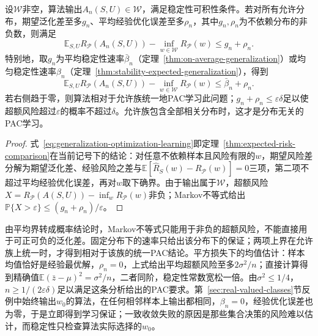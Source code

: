 \begin{theorem}[稳定性与经验最优性给出超额期望风险]
\label{thm:generalization-optimization-learning}
\label{thm:stability-excess-risk}
设$\mathcal W$非空，算法输出$A_n(S,U)\in\mathcal W$，满足稳定性可积性条件。若对所有允许分布，期望泛化差至多$g_n$、平均经验优化误差至多$\rho_n$，其中$g_n,\rho_n$为不依赖分布的非负数，则满足
\begin{equation}
 \mathbb E_{S,U}R_{\mathcal P}(A_n(S,U))-\inf_{w\in\mathcal W}R_{\mathcal P}(w)\leq g_n+\rho_n.
 \label{eq:generalization-optimization-learning}
\end{equation}
特别地，取$g_n$为平均稳定性速率$\bar\beta_n$（定理~\ref{thm:on-average-generalization}）或均匀稳定性速率$\beta_n$（定理~\ref{thm:stability-expected-generalization}），得到
\begin{equation}
 \mathbb E_{S,U}R_{\mathcal P}(A_n(S,U))-\inf_{w\in\mathcal W}R_{\mathcal P}(w)\leq\bar\beta_n+\rho_n.
 \label{eq:stability-excess-risk}
\end{equation}
若右侧趋于零，则算法相对于允许族统一地PAC学习此问题；$g_n+\rho_n\leq\varepsilon\delta$足以使超额风险超过$\varepsilon$的概率不超过$\delta$。允许族包含全部相关分布时，这才是分布无关的PAC学习。
\end{theorem}
\begin{proof}
式~\eqref{eq:generalization-optimization-learning}即定理~\ref{thm:expected-risk-comparison}在当前记号下的结论：对任意不依赖样本且风险有限的$w$，期望风险差分解为期望泛化差、经验风险之差与$\mathbb E[\hat R_S(w)-R_{\mathcal P}(w)]=0$三项，第二项不超过平均经验优化误差，再对$w$取下确界。由于输出属于$\mathcal W$，超额风险$X=R_{\mathcal P}(A(S,U))-\inf_wR_{\mathcal P}(w)$非负；Markov不等式给出$\mathbb P\{X>\varepsilon\}\leq(g_n+\rho_n)/\varepsilon$。
\end{proof}

由平均界转成概率结论时，Markov不等式只能用于非负的超额风险，不能直接用于可正可负的泛化差。固定分布下的速率只给出该分布下的保证；两项上界在允许族上统一时，才得到相对于该族的统一PAC结论。平方损失下的均值估计：样本均值恰好是经验最优解，$\rho_n=0$，上式给出平均超额风险至多$2\sigma^2/n$；直接计算得到精确值$\mathbb E(\bar z-\mu)^2=\sigma^2/n$，二者同阶，稳定性常数宽松一倍。由$\sigma^2\leq1/4$，$n\geq1/(2\varepsilon\delta)$足以满足这条分析给出的PAC要求。第~\ref{sec:real-valued-classes}节反例中始终输出$w_0$的算法，在任何相邻样本上输出都相同，$\beta_n=0$，经验优化误差也为零，于是立即得到学习保证；一致收敛失败的原因是那些集合决策的风险难以估计，而稳定性只检查算法实际选择的$w_0$。

